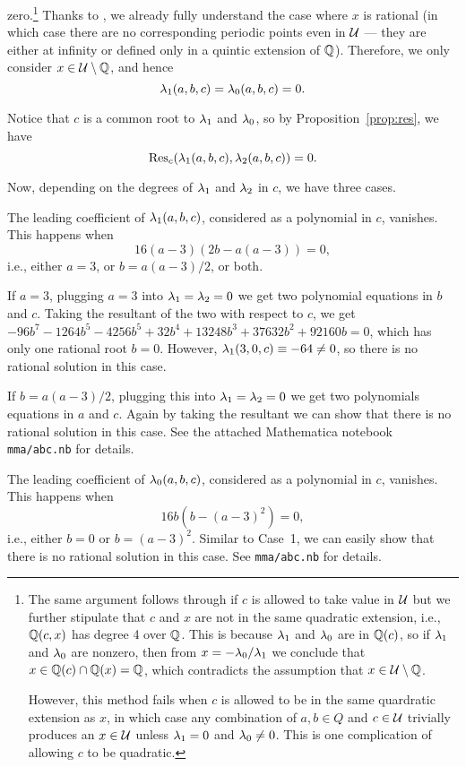 zero.\footnote{%
  The same argument follows through if $c$ is allowed to take value
  in $\mathcal{U}$ but we further stipulate that $c$ and $x$ are not in the
  same quadratic extension, i.e., $\mathbb{Q}(c, x)$ has degree 4 over
  $\mathbb{Q}$. This is because $\lambda_1$ and $\lambda_0$ are in $\mathbb{Q}(c)$, so if $\lambda_1$
  and $\lambda_0$ are nonzero, then from $x = -\lambda_0/\lambda_1$ we conclude that
  $x \in \mathbb{Q}(c) \cap \mathbb{Q}(x) = \mathbb{Q}$, which contradicts the assumption that
  $x \in \mathcal{U} \setminus \mathbb{Q}$.

  However, this method fails when $c$ is allowed to be in the same
  quardratic extension as $x$, in which case any combination of $a, b
  \in Q$ and $c \in \mathcal{U}$ trivially produces an $x \in \mathcal{U}$ unless $\lambda_1
  = 0$ and $\lambda_0 \ne 0$. This is one complication of allowing $c$ to
  be quadratic.
}
Thanks to \cite{MR1480542}, we already fully understand the case
where $x$ is rational (in which case there are no corresponding
periodic points even in $\mathcal{U}$ --- they are either at infinity or
defined only in a quintic extension of $\mathbb{Q}$). Therefore, we only
consider $x \in \mathcal{U} \setminus \mathbb{Q}$, and hence
\[
\lambda_1(a, b, c) = \lambda_0(a, b, c) = 0.
\]

Notice that $c$ is a common root to $\lambda_1$ and $\lambda_0$, so by
Proposition~\ref{prop:res}, we have
\[
\mathrm{Res}_c(\lambda_1(a, b, c), \lambda_2(a, b, c)) = 0.
\]

Now, depending on the degrees of $\lambda_1$ and $\lambda_2$ in $c$, we have
three cases.

\begin{case}
  The leading coefficient of $\lambda_1(a, b, c)$, considered as a
  polynomial in $c$, vanishes. This happens when
  \[
  16(a - 3)(2b - a(a-3)) = 0,
  \]
  i.e., either $a = 3$, or $b = a(a-3)/2$, or both.

  If $a = 3$, plugging $a = 3$ into $\lambda_1 = \lambda_2 = 0$ we get two
  polynomial equations in $b$ and $c$. Taking the resultant of the two
  with respect to $c$, we get $- 96b^7 - 1264b^5 - 4256b^5 + 32b^4 +
  13248b^3 + 37632b^2 + 92160b = 0$, which has only one rational root
  $b = 0$. However, $\lambda_1(3, 0, c) \equiv -64 \ne 0$, so there is no
  rational solution in this case.

  If $b = a(a-3)/2$, plugging this into $\lambda_1 = \lambda_2 = 0$ we get two
  polynomials equations in $a$ and $c$. Again by taking the resultant
  we can show that there is no rational solution in this case. See the
  attached Mathematica notebook \texttt{mma/abc.nb} for details.
\end{case}

\begin{case}
  The leading coefficient of $\lambda_0(a, b, c)$, considered as a
  polynomial in $c$, vanishes. This happens when
  \[
  16b(b - (a-3)^2) = 0,
  \]
  i.e., either $b = 0$ or $b = (a - 3)^2$. Similar to Case~1, we can
  easily show that there is no rational solution in this case. See
  \texttt{mma/abc.nb} for details.
\end{case}

